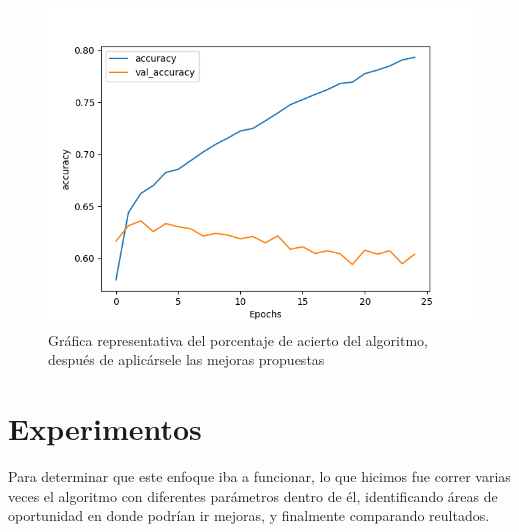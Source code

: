 \documentclass[a4]{sciposter}
\begin{document}
\begin{multicols}{2}
\begin{figure}
	\centering
	\captionsetup{type=figure}
	\setcounter{figure}{1}
	\includegraphics[scale=1.5]{img/Accuracy 2021-07.png}
	\caption{Gráfica representativa del porcentaje de acierto del algoritmo, después de aplicársele las mejoras propuestas}	
\end{figure}

\section{Experimentos}

Para determinar que este enfoque iba a funcionar, lo que hicimos fue correr varias veces el algoritmo con diferentes parámetros dentro de él, identificando áreas de oportunidad en donde podrían ir mejoras, y finalmente comparando reultados.


\end{multicols}
\end{document}
